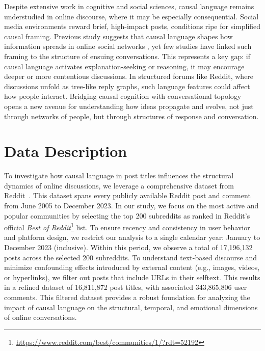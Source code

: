 \documentclass[acmsmall]{acmart}
\begin{document}
Despite extensive work in cognitive and social sciences, causal language remains understudied in online discourse, where it may be especially consequential. Social media environments reward brief, high-impact posts, conditions ripe for simplified causal framing. Previous study suggests that causal language shapes how information spreads in online social networks \cite{shi2024diffusion}, yet few studies have linked such framing to the structure of ensuing conversations. This represents a key gap: if causal language activates explanation-seeking or reasoning, it may encourage deeper or more contentious discussions. In structured forums like Reddit, where discussions unfold as tree-like reply graphs, such language features could affect how people interact. Bridging causal cognition with conversational topology opens a new avenue for understanding how ideas propagate and evolve, not just through networks of people, but through structures of response and conversation.




\section{Data Description}

To investigate how causal language in post titles influences the structural dynamics of online discussions, we leverage a comprehensive dataset from Reddit~\cite{redditdata}. This dataset spans every publicly available Reddit post and comment from June 2005 to December 2023. In our study, we focus on the most active and popular communities by selecting the top 200 subreddits as ranked in Reddit's official \textit{Best of Reddit}\footnote{\url{https://www.reddit.com/best/communities/1/?rdt=52192}} list. To ensure recency and consistency in user behavior and platform design, we restrict our analysis to a single calendar year: January to December 2023 (inclusive). Within this period, we observe a total of 17,196,132 posts across the selected 200 subreddits. To understand text-based discourse and minimize confounding effects introduced by external content (e.g., images, videos, or hyperlinks), we filter out posts that include URLs in their selftext. This results in a refined dataset of 16,811,872 post titles, with associated 343,865,806 user comments. This filtered dataset provides a robust foundation for analyzing the impact of causal language on the structural, temporal, and emotional dimensions of online conversations.
\end{document}
